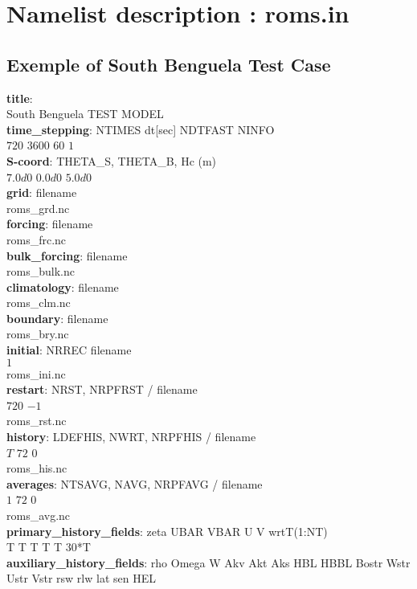 \section{Namelist description : roms.in}\label{namelistdesc}

\subsection{Exemple of South Benguela Test Case}
\textbf{title}: \\
South Benguela TEST MODEL \\
\textbf{time\_stepping}: NTIMES   dt[sec]  NDTFAST  NINFO \\
$720$      $3600$     $60$      $1$ \\
\textbf{S-coord}: THETA\_S,   THETA\_B,    Hc (m) \\
$7.0d0$      $0.0d0$      $5.0d0$ \\
\textbf{grid}:  filename \\
roms\_grd.nc \\
\textbf{forcing}: filename \\
roms\_frc.nc \\
\textbf{bulk\_forcing}: filename \\
roms\_bulk.nc \\
\textbf{climatology}: filename \\
roms\_clm.nc \\
\textbf{boundary}: filename \\
roms\_bry.nc \\
\textbf{initial}: NRREC  filename \\
$1$  \\
roms\_ini.nc \\
\textbf{restart}:          NRST, NRPFRST / filename \\
$720$    $-1$ \\
roms\_rst.nc \\
\textbf{history}: LDEFHIS, NWRT, NRPFHIS / filename  \\
$T$      $72$     $0$ \\
roms\_his.nc \\
\textbf{averages}: NTSAVG, NAVG, NRPFAVG / filename \\
$1$      $72$     $0$ \\
roms\_avg.nc \\
\textbf{primary\_history\_fields}: zeta UBAR VBAR  U  V   wrtT(1:NT) \\
T    T   T   T  T    $30$*T \\
\textbf{auxiliary\_history\_fields}:   rho Omega  W  Akv  Akt  Aks  HBL HBBL Bostr Wstr Ustr Vstr rsw rlw lat sen HEL \\
